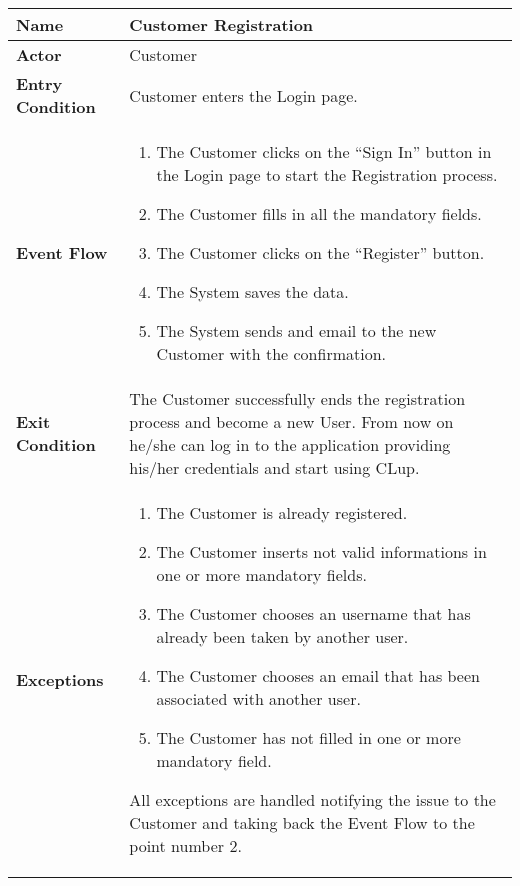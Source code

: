 \begin{center}
    \begin{tabular}{ | l | p{11cm} |}
    \hline
    \textbf{Name} & Customer Registration \\ \hline
    \textbf{Actor} & Customer \\ \hline
    \textbf{Entry Condition} & Customer enters the Login page.  \\ \hline
    \textbf{Event Flow} & \begin{enumerate}
					\item The Customer clicks on the “Sign In” button in the Login page to start the Registration process.
					\item The Customer fills in all the mandatory fields.
					\item The Customer clicks on the “Register” button.
					\item The System saves the data.
					\item The System sends and email to the new Customer with the confirmation.
		            \end{enumerate}\\  \hline
    \textbf{Exit Condition} & The Customer successfully ends the registration process and become a new User. From now on he/she can log in to the application providing his/her credentials and start using CLup. \\ \hline
    \textbf{Exceptions} & \begin{enumerate}
					\item The Customer is already registered.
					\item The Customer inserts not valid informations in one or more mandatory fields.
					\item The Customer chooses an username that has already been taken by another user. 
					\item The Customer chooses an email that has been associated with another user.
					\item The Customer has not filled in one or more mandatory field.
		            \end{enumerate} All exceptions are handled notifying the issue to the Customer and taking back the Event Flow to the point number 2.\\  \hline
    \end{tabular}
\end{center}

